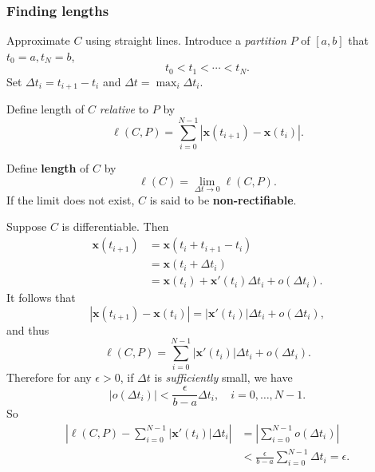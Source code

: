 \subsubsection*{Finding lengths}

Approximate $C$ using straight lines. Introduce a \textit{partition} $P$ of $[a,b]$ that $ t_0 = a, t_N = b $,
\[
    t_0<t_1<\cdots<t_N.
\]
Set $ \Delta t_i = t_{i+1}-t_i $ and $ \Delta t = \max_i \Delta t_i $.
\begin{definition}
    Define length of $C$ \textit{relative} to $P$ by
    \[
        \ell (C,P) = \sum_{i=0}^{N-1} \left| \mathbf{x}(t_{i+1})-\mathbf{x}(t_i) \right|.
    \]
\end{definition}

\begin{center}
\end{center}

\begin{definition}
    Define \textbf{length} of $C$ by
    \[
        \ell (C) = \lim_{\Delta t \to 0} \ell (C,P).
    \]
    If the limit does not exist, $C$ is said to be \textbf{non-rectifiable}.
\end{definition}

Suppose $C$ is differentiable. Then
\begin{align*}
    \mathbf{x}(t_{i+1}) & = \mathbf{x}(t_i+t_{i+1}-t_i)                                   \\
                        & = \mathbf{x}(t_i+ \Delta t_i)                                   \\
                        & = \mathbf{x}(t_i) + \mathbf{x}'(t_i)\Delta t_i + o(\Delta t_i).
\end{align*}
It follows that
\[
    \left| \mathbf{x}(t_{i+1})- \mathbf{x}(t_i)\right| =\left| \mathbf{x}'(t_i) \right| \Delta t_i + o(\Delta t_i),
\]
and thus 
\[
    \ell (C,P) = \sum_{i=0}^{N-1} \left| \mathbf{x}'(t_i) \right| \Delta t_i + o(\Delta t_i).
\]
Therefore for any $ \epsilon>0 $, if $ \Delta t $ is \textit{sufficiently} small, we have 
\[
    \left| o(\Delta t_i) \right| < \frac{\epsilon }{b-a} \Delta t_i, \quad i=0,\dots,N-1.
\]
So 
\begin{align*}
    \left| \ell (C,P) - \sum_{i=0}^{N-1} \left| \mathbf{x}'(t_i) \right| \Delta t_i \right| &= \left| \sum_{i=0}^{N-1} o(\Delta t_i) \right| \\ 
    &< \frac{\epsilon}{b-a} \sum_{i=0}^{N-1} \Delta t_i = \epsilon.
\end{align*}

